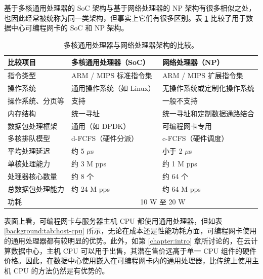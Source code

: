 基于多核通用处理器的 SoC 架构与基于网络处理器的 NP 架构有很多相似之处，也因此经常被统称为同一类架构，但事实上它们有很多区别。表 \ref{background:tab:soc-vs-np} 比较了用于数据中心可编程网卡的 SoC 和 NP 架构。

\begin{table}[htbp]
	\centering
	\caption{多核通用处理器与网络处理器架构的比较。}
	\small
	\begin{tabular}{l|p{}|p{}}
		\hline
		比较项目 & 多核通用处理器（SoC） & 网络处理器（NP） \\
		\hline
		\hline
		指令类型 & ARM / MIPS 标准指令集 & ARM / MIPS 扩展指令集 \\
		\hline
		操作系统 & 通用操作系统（如 Linux） & 无操作系统或定制化操作系统 \\
		\hline
		操作系统、分页等 & 支持 & 一般不支持 \\
		\hline
		内存结构 & 统一寻址 & 统一寻址和定制数据通路结合 \\
		\hline
		数据包处理框架 & 通用（如 DPDK） & 可编程网卡专用 \\
		\hline
		多核排队模型 & d-FCFS（硬件分派） & c-FCFS（硬件调度） \\
		\hline
		平均处理延迟 & 约 5 $\mu$s & 小于 2 $\mu$s \\
		\hline
		单核处理能力 & 约 3 M pps & 约 1 M pps \\
		\hline
		处理器核心数量 & 约 8 个 & 约 64 个 \\
		\hline
		总数据包处理能力 & 约 24 M pps & 约 64 M pps \\
		\hline
		功耗 & \multicolumn{2}{c}{10 W 至 20 W} \\ 
		\hline
	\end{tabular}
	\label{background:tab:soc-vs-np}
\end{table}


表面上看，可编程网卡与服务器主机 CPU 都使用通用处理器，但如表 \ref{background:tab:host-cpu} 所示，无论在成本还是性能功耗方面，可编程网卡使用的通用处理器都有较明显的优势。此外，如第 \ref{chapter:intro} 章所讨论的，在云计算数据中心，主机 CPU 可以用于出售，其潜在售价远高于单一 CPU 组件的硬件价格。因此，在数据中心使用嵌入在可编程网卡内的通用处理器，比传统上使用主机 CPU 的方法仍然是有优势的。

